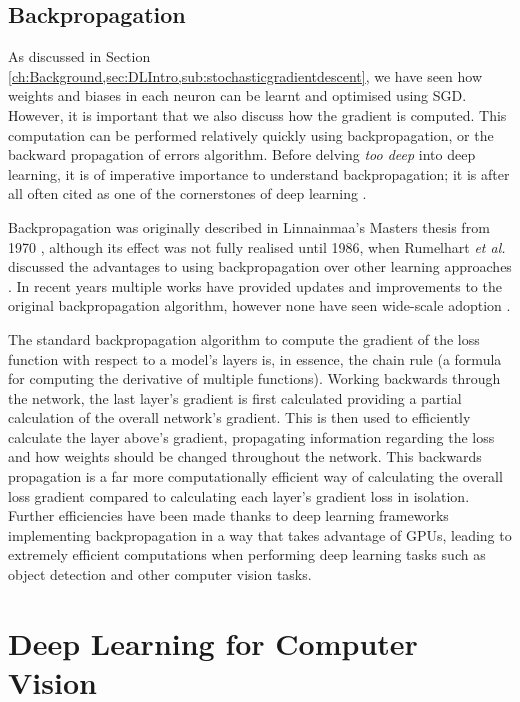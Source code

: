 \subsection{Backpropagation}\label{ch:Background,sec:DLIntro,sub:backprop}

As discussed in Section \ref{ch:Background,sec:DLIntro,sub:stochasticgradientdescent}, we have seen how weights and biases in each neuron can be learnt and optimised using SGD. However, it is important that we also discuss how the gradient is computed. This computation can be performed relatively quickly using backpropagation, or the backward propagation of errors algorithm. Before delving \textit{too deep} into deep learning, it is of imperative importance to understand backpropagation; it is after all often cited as one of the cornerstones of deep learning \cite{alber_backprop_2018}.

Backpropagation was originally described in Linnainmaa's Masters thesis from 1970 \cite{linnainmaa_representation_1970}, although its effect was not fully realised until 1986, when Rumelhart \textit{et al.} discussed the advantages to using backpropagation over other learning approaches \cite{rumelhart_learning_1986}. In recent years multiple works have provided updates and improvements to the original backpropagation algorithm, however none have seen wide-scale adoption \cite{bengio_use_1994, lillicrap_random_2014, lee_difference_2015, nokland_direct_2016, liao_how_2016}. 

The standard backpropagation algorithm to compute the gradient of the loss function with respect to a model's layers is, in essence, the chain rule (a formula for computing the derivative of multiple functions). Working backwards through the network, the last layer's gradient is first calculated providing a partial calculation of the overall network's gradient. This is then used to efficiently calculate the layer above's gradient, propagating information regarding the loss and how weights should be changed throughout the network. This backwards propagation is a far more computationally efficient way of calculating the overall loss gradient compared to calculating each layer's gradient loss in isolation. Further efficiencies have been made thanks to deep learning frameworks implementing backpropagation in a way that takes advantage of GPUs, leading to extremely efficient computations when performing deep learning tasks such as object detection and other computer vision tasks.


\section{Deep Learning for Computer Vision}\label{ch:Background,sec:DLforCV}


